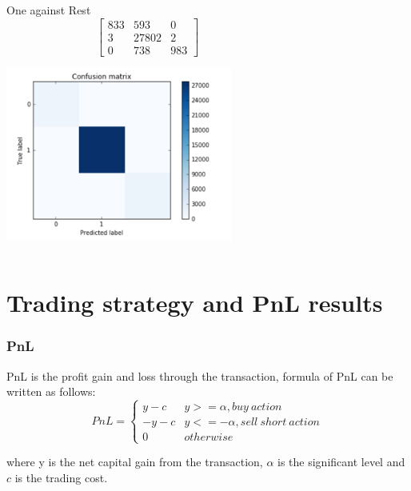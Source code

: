 \documentclass[xcolor={x11names,svgnames,dvipsnames}]{beamer}
\begin{document}
\begin{frame}
\begin{columns}
	\begin{block}{One against Rest}
\begin{equation*}       
\left[           
  \begin{array}{ccc}   
    833&    593 &    0\\  
     3& 27802& 2\\  
    0  &  738 & 983
  \end{array}
\right]               
\end{equation*}
\begin{center}
     \includegraphics[width=0.8\textwidth, height=0.45\textheight]{one_vs_rest.png}
\end{center}     
\end{block}
\end{columns}

\end{frame}


\section{Trading strategy and PnL results}

\begin{frame}
\frametitle{PnL}

PnL is the profit gain and loss through the transaction, formula of PnL can be written as follows:\\
\begin{equation*}       
PnL=\left\{          
  \begin{array}{ll}   
    y-c  & y>=\alpha, buy\ action   \\  
     -y-c & y<=-\alpha, sell\ short\ action \\
     0 & otherwise
  \end{array}
\right.       
\end{equation*}

where y is the net capital gain from the transaction, $\alpha$ is the significant level and $c$ is the trading cost.
\end{frame}
\end{document}
